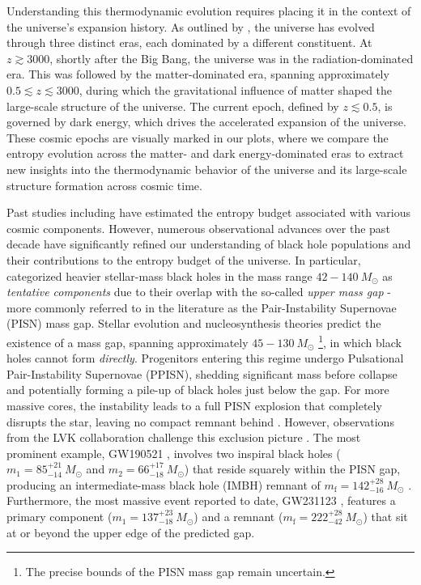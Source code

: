 \documentclass[twocolumn]{aastex631}
\begin{document}
Understanding this thermodynamic evolution requires placing it in the context of the universe’s expansion history. As outlined by \cite{Frieman_2008}, the universe has evolved through three distinct eras, each dominated by a different constituent. At $z \gtrsim 3000$, shortly after the Big Bang, the universe was in the radiation-dominated era.  This was followed by the matter-dominated era, spanning approximately $0.5 \lesssim z \lesssim 3000$, during which the gravitational influence of matter shaped the large-scale structure of the universe. The current epoch, defined by $z \lesssim 0.5$, is governed by dark energy, which drives the accelerated expansion of the universe. These cosmic epochs are visually marked in our plots, where we compare the entropy evolution across the matter- and dark energy-dominated eras to extract new insights into the thermodynamic behavior of the universe and its large-scale structure formation across cosmic time.

Past studies including \cite{Frampton_2008, Berman_2009, Frampton_2009, frampton2009entropyintermediatemassblackholes,  Egan_2010, Frampton_2011} have estimated the entropy budget associated with various cosmic components. However, numerous observational advances over the past decade have significantly refined our understanding of black hole populations and their contributions to the entropy budget of the universe. In particular, \cite{Egan_2010} categorized heavier stellar-mass black holes in the mass range $42 - 140~M_\odot$ as \textit{tentative components} due to their overlap with the so-called \textit{upper mass gap} - more commonly referred to in the literature as the Pair-Instability Supernovae (PISN) mass gap. Stellar evolution and nucleosynthesis theories predict the existence of a mass gap, spanning approximately $ 45 - 130~M_\odot$ \footnote{The precise bounds of the PISN mass gap remain uncertain.}, in which black holes cannot form \textit{directly}. Progenitors entering this regime undergo Pulsational Pair-Instability Supernovae (PPISN), shedding significant mass before collapse and potentially forming a pile-up of black holes just below the gap. For more massive cores, the instability leads to a full PISN explosion that completely disrupts the star, leaving no compact remnant behind \citep{Woosley_2017, Farmer_2019, Fishbach_2020, Marchant_2020, Woosley_2021, Edelman_2022}. However, observations from the LVK collaboration challenge this exclusion picture \citep{Di_Carlo_2020, O_Brien_2021, Costa_2022, winch2024predictingheaviestblackholes}. The most prominent example, GW190521 \citep{LIGOScientific:2020iuh}, involves two inspiral black holes ($m_1 = 85^{+21}_{-14}~M_{\odot}$ and $m_2 = 66^{+17}_{-18}~M_{\odot}$) that reside squarely within the PISN gap, producing an intermediate-mass black hole (IMBH) remnant of $m_\mathrm{f} = 142^{+28}_{-16}~M_{\odot}$ \citep{GW190521astro, Greene_2020, Ruiz-Rocha2025yno}. Furthermore, the most massive event reported to date, GW231123 \citep{2025ApJ...993L..25A}, features a primary component ($m_1 = 137^{+23}_{-18}~M_\odot$) and a remnant ($m_\mathrm{f} = 222^{+28}_{-42}~M_\odot$) that sit at or beyond the upper edge of the predicted gap.
\end{document}
